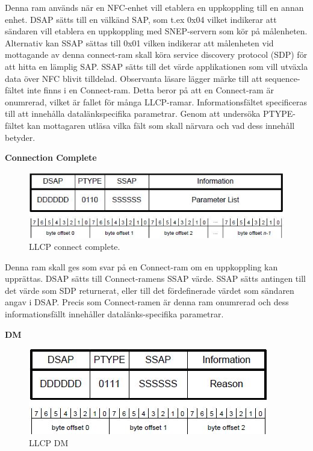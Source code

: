 \documentclass[11pt]{article}
\begin{document}
Denna ram används när en NFC-enhet vill etablera en uppkoppling till en annan enhet. DSAP sätts till en välkänd SAP, som t.ex 0x04 vilket indikerar att sändaren vill etablera en uppkoppling med SNEP-servern som kör på målenheten. Alternativ kan SSAP sättas till 0x01 vilken indikerar att målenheten vid mottagande av denna connect-ram skall köra service discovery protocol (SDP) för att hitta en lämplig SAP. SSAP sätts till det värde applikationen som vill utväxla data över NFC blivit tilldelad. Observanta läsare lägger märke till att sequence-fältet inte finns i en Connect-ram. Detta beror på att en Connect-ram är onumrerad, vilket är fallet för många LLCP-ramar. Informationsfältet specificeras till att innehålla datalänkspecifika parametrar. Genom att undersöka PTYPE-fältet kan mottagaren utläsa vilka fält som skall närvara och vad dess innehåll betyder.

\textbf{Connection Complete}

\begin{figure}[H]
\centering
\includegraphics[scale=0.8]{LLCP_connect_complete.jpg}
\caption{LLCP connect complete.}
\label{fig:LLCP_connect_complete}
\end{figure}

Denna ram skall ges som svar på en Connect-ram om en uppkoppling kan upprättas. DSAP sätts till Connect-ramens SSAP värde. SSAP sätts antingen till det värde som SDP returnerat, eller till det fördefinerade värdet som sändaren angav i DSAP. Precis som Connect-ramen är denna ram onumrerad och dess informationsfällt innehåller datalänks-specifika parametrar.

\textbf{DM}

\begin{figure}[H]
\centering
\includegraphics[scale=0.8]{LLCP_DM.jpg}
\caption{LLCP DM}
\label{fig:LLCP_DM}
\end{figure}
\end{document}
